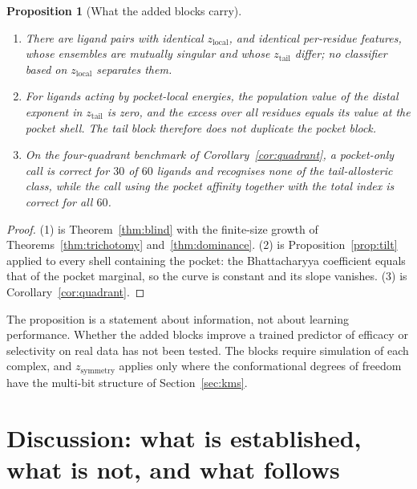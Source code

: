 \documentclass[11pt,reqno]{amsart}
\theoremstyle{plain}
\newtheorem{proposition}[theorem]{Proposition}
\theoremstyle{definition}
\theoremstyle{remark}
\numberwithin{equation}{section}
\begin{document}
\begin{proposition}[What the added blocks carry]\label{prop:rep}
\begin{enumerate}[label=\textup{(\arabic*)},leftmargin=*]
\item There are ligand pairs with identical $z_{\mathrm{local}}$, and identical per-residue features, whose ensembles are mutually singular and whose $z_{\mathrm{tail}}$ differ; no classifier based on $z_{\mathrm{local}}$ separates them.
\item For ligands acting by pocket-local energies, the population value of the distal exponent in $z_{\mathrm{tail}}$ is zero, and the excess over all residues equals its value at the pocket shell. The tail block therefore does not duplicate the pocket block.
\item On the four-quadrant benchmark of Corollary~\ref{cor:quadrant}, a pocket-only call is correct for $30$ of $60$ ligands and recognises none of the tail-allosteric class, while the call using the pocket affinity together with the total index is correct for all $60$.
\end{enumerate}
\end{proposition}

\begin{proof}
(1) is Theorem~\ref{thm:blind} with the finite-size growth of Theorems~\ref{thm:trichotomy} and~\ref{thm:dominance}. (2) is Proposition~\ref{prop:tilt} applied to every shell containing the pocket: the Bhattacharyya coefficient equals that of the pocket marginal, so the curve is constant and its slope vanishes. (3) is Corollary~\ref{cor:quadrant}.
\end{proof}

The proposition is a statement about information, not about learning performance. Whether the added blocks improve a trained predictor of efficacy or selectivity on real data has not been tested. The blocks require simulation of each complex, and $z_{\mathrm{symmetry}}$ applies only where the conformational degrees of freedom have the multi-bit structure of Section~\ref{sec:kms}.

\section{Discussion: what is established, what is not, and what follows}
\label{sec:discussion}
\end{document}

